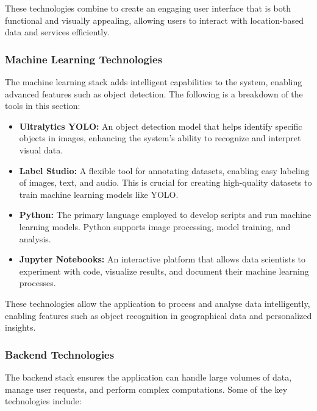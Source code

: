 These technologies combine to create an engaging user interface that is both functional and visually appealing, allowing users to interact with location{-}based data and services efficiently.

\subsubsection{Machine Learning Technologies}

The machine learning stack adds intelligent capabilities to the system, enabling advanced features such as object detection. The following is a breakdown of the tools in this section: 

\begin{itemize}
    \item{} \textbf{Ultralytics YOLO:}  An object detection model that helps identify specific objects in images, enhancing the system's ability to recognize and interpret visual data. 
    \item{} \textbf{Label Studio:} A flexible tool for annotating datasets, enabling easy labeling of images, text, and audio. This is crucial for creating high-quality datasets to train machine learning models like YOLO. 
    \item{} \textbf{Python:} The primary language employed to develop scripts and run machine learning models. Python supports image processing, model training, and analysis. 
    \item{} \textbf{Jupyter Notebooks:} An interactive platform that allows data scientists to experiment with code, visualize results, and document their machine learning processes. 
\end{itemize}

These technologies allow the application to process and analyse data intelligently, enabling features such as object recognition in geographical data and personalized insights.

\subsubsection{Backend Technologies}

The backend stack ensures the application can handle large volumes of data, manage user requests, and perform complex computations. Some of the key technologies include:

